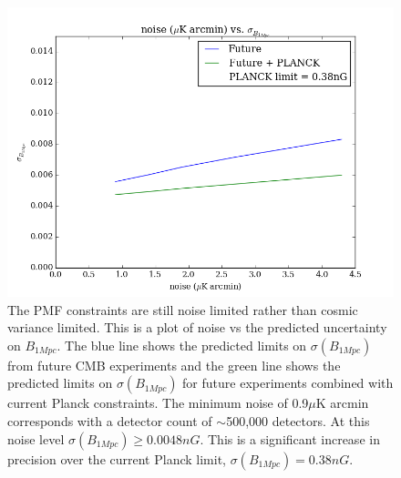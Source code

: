 \begin{figure}[h]
\centering
\includegraphics[scale=0.7]{images/noise.png}
\caption{The PMF constraints are still noise limited rather than cosmic variance limited. This is a plot of noise vs the predicted uncertainty on $B_{1Mpc}$. The blue line shows the predicted limits on $\sigma(B_{1Mpc})$ from future CMB experiments and the green line shows the predicted limits on $\sigma(B_{1Mpc})$ for future experiments combined with current Planck constraints. The minimum noise of 0.9$\mu$K arcmin corresponds with a detector count of $\sim$500,000 detectors. At this noise level $\sigma(B_{1Mpc}) \geq 0.0048nG$. This is a significant increase in precision over the current Planck limit, $\sigma(B_{1Mpc}) = 0.38nG$.}
\label{fig:noise}
\end{figure}

